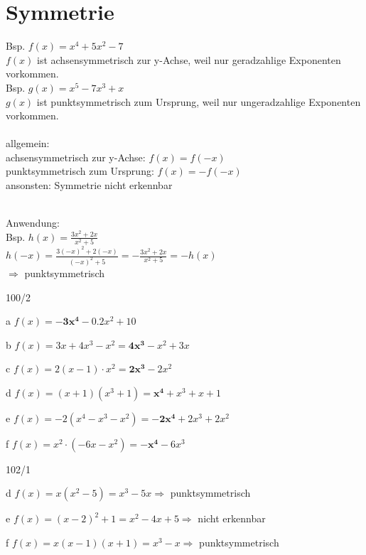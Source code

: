 \section{Symmetrie}
Bsp. $f(x) = x^4 + 5x^2 - 7$ \\
$f(x)$ ist achsensymmetrisch zur y-Achse, weil nur geradzahlige Exponenten vorkommen. \\
Bsp. $g(x) = x^5 - 7x^3 + x$ \\
$g(x)$ ist punktsymmetrisch zum Ursprung, weil nur ungeradzahlige Exponenten vorkommen. \\\\
allgemein: \\
achsensymmetrisch zur y-Achse: $f(x) = f(-x)$ \\
punktsymmetrisch zum Ursprung: $f(x) = -f(-x)$ \\
ansonsten: Symmetrie nicht erkennbar \\\\
\begin{onepage}
  Anwendung: \\
  Bsp. $h(x) = \frac{3x^2 + 2x}{x^2 + 5}$ \\
  $h(-x) = \frac{3(-x)^2 + 2(-x)}{(-x)^2 + 5} = -\frac{3x^2 + 2x}{x^2 + 5} = -h(x)$ \\
  $\Rightarrow$ punktsymmetrisch
\end{onepage}
\begin{exercise}{100/2}
  \item [a] $f(x) = \boldsymbol{-3x^4} - 0.2x^2 + 10$
  \item [b] $f(x) = 3x + 4x^3 - x^2 = \boldsymbol{4x^3} - x^2 + 3x$
  \item [c] $f(x) = 2(x - 1) \cdot x^2 = \boldsymbol{2x^3} - 2x^2$
  \item [d] $f(x) = (x + 1)(x^3 + 1) = \boldsymbol{x^4} + x^3 + x + 1$
  \item [e] $f(x) = -2(x^4 - x^3 - x^2) = \boldsymbol{-2x^4} + 2x^3 + 2x^2$
  \item [f] $f(x) = x^2 \cdot (-6x - x^2) = \boldsymbol{-x^4} - 6x^3$
\end{exercise}
\begin{exercise}{102/1}
  \item [d] $f(x) = x(x^2 - 5) = x^3 - 5x \Rightarrow $ punktsymmetrisch
  \item [e] $f(x) = (x - 2)^2 + 1 = x^2 - 4x + 5 \Rightarrow $ nicht erkennbar
  \item [f] $f(x) = x(x - 1)(x + 1) = x^3 - x \Rightarrow $ punktsymmetrisch
\end{exercise}

